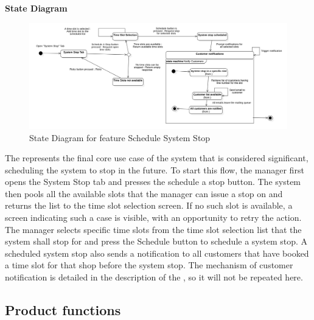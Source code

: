 \textbf{State Diagram}

\begin{figure}[H]
    \centering
    \includegraphics[height=0.4\textwidth]{Images/StateCharts/ScheduleSystemStop.png}
    \caption{State Diagram for feature Schedule System Stop}
    \label{fig:SDScheduleStop}
\end{figure}

The  represents the final core use case of the system that is considered significant, scheduling the system to stop in the future.
To start this flow, the manager first opens the System Stop tab and presses the schedule a stop button.
The system then pools all the available slots that the manager can issue a stop on and returns the list to the time slot selection screen.
If no such slot is available, a screen indicating such a case is visible, with an opportunity to retry the action.
The manager selects specific time slots from the time slot selection list that the system shall stop for and press the Schedule button to schedule a system stop.
A scheduled system stop also sends a notification to all customers that have booked a time slot for that shop before the system stop.
The mechanism of customer notification is detailed in the description of the , so it will not be repeated here.


\subsection{Product functions}



